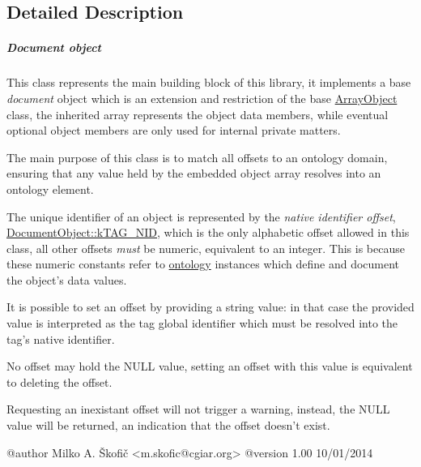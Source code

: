 \subsection{Detailed Description}
\subparagraph*{Document object}

This class represents the main building block of this library, it implements a base {\itshape document} object which is an extension and restriction of the base \hyperlink{}{Array\-Object} class, the inherited array represents the object data members, while eventual optional object members are only used for internal private matters.

The main purpose of this class is to match all offsets to an ontology domain, ensuring that any value held by the embedded object array resolves into an ontology element.

The unique identifier of an object is represented by the {\itshape native identifier offset}, \hyperlink{}{Document\-Object\-::k\-T\-A\-G\-\_\-\-N\-I\-D}, which is the only alphabetic offset allowed in this class, all other offsets {\itshape must} be numeric, equivalent to an integer. This is because these numeric constants refer to \hyperlink{}{ontology} instances which define and document the object's data values.

It is possible to set an offset by providing a string value\-: in that case the provided value is interpreted as the tag global identifier which must be resolved into the tag's native identifier.

No offset may hold the {\ttfamily N\-U\-L\-L} value, setting an offset with this value is equivalent to deleting the offset.

Requesting an inexistant offset will not trigger a warning, instead, the {\ttfamily N\-U\-L\-L} value will be returned, an indication that the offset doesn't exist. \begin{DoxyVerb} @author            Milko A. Škofič <m.skofic@cgiar.org>
 @version   1.00 10/01/2014\end{DoxyVerb}
 

